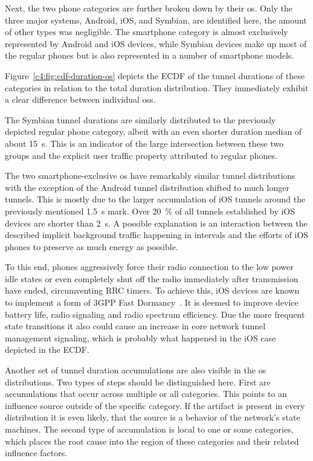 Next, the two phone categories are further broken down by their \gls{os}. Only the three major systems, Android, iOS, and Symbian, are identified here, the amount of other types was negligible. The smartphone category is almost exclusively represented by Android and iOS devices, while Symbian devices make up most of the regular phones but is also represented in a number of smartphone models.

Figure~\ref{c4:fig:cdf-duration-os} depicts the \gls{ECDF} of the tunnel durations of these categories in relation to the total duration distribution. They immediately exhibit a clear difference between individual \glspl{os}.

The Symbian tunnel durations are similarly distributed to the previously depicted regular phone category, albeit with an even shorter duration median of about \SI{15}{\second}. This is an indicator of the large intersection between these two groups and the explicit user traffic property attributed to regular phones.

The two smartphone-exclusive \gls{os} have remarkably similar tunnel distributions with the exception of the Android tunnel distribution shifted to much longer tunnels. This is mostly due to the larger accumulation of iOS tunnels around the previously mentioned \SI{1.5}{\second} mark. Over \SI{20}{\percent} of all tunnels established by iOS devices are shorter than \SI{2}{\second}. A possible explanation is an interaction between the described implicit background traffic happening in intervals and the efforts of iOS phones to preserve as much energy as possible. 

To this end, phones aggressively force their radio connection to the low power idle states or even completely shut off the radio immediately after transmission have ended, circumventing \gls{RRC} timers. To achieve this, iOS devices are known to implement a form of \gls{3GPP} Fast Dormancy~\cite{gsma2011fdbestpract}. It is deemed to improve device battery life, radio signaling and radio spectrum efficiency. Due the more frequent state transitions it also could cause an increase in core network tunnel management signaling, which is probably what happened in the iOS case depicted in the \gls{ECDF}.

Another set of tunnel duration accumulations are also visible in the \gls{os} distributions. Two types of steps should be distinguished here. First are accumulations that occur across multiple or all categories. This points to an influence source outside of the specific category. If the artifact is present in every distribution it is even likely, that the source is a behavior of the network's state machines. The second type of accumulation is local to one or some categories, which places the root cause into the region of these categories and their related influence factors. 

